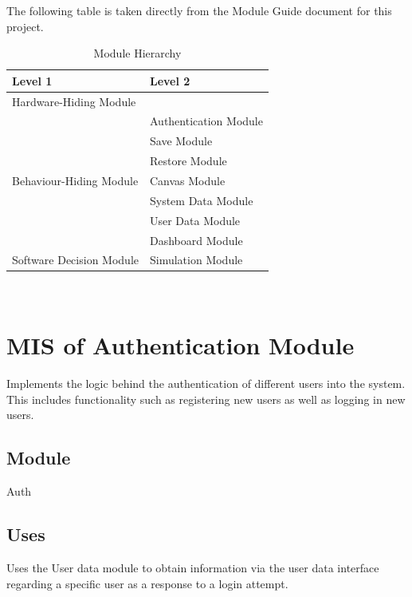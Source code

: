 \documentclass[12pt, titlepage]{article}
\begin{document}
The following table is taken directly from the Module Guide document for this project.

\begin{table}[h!]
  \centering
  \begin{tabular}{p{} p{}}
  \toprule
  \textbf{Level 1} & \textbf{Level 2}\\
  \midrule
  
  {Hardware-Hiding Module} &  \\
  \midrule
  
  \multirow{7}{0.3\textwidth}{Behaviour-Hiding Module} & Authentication Module\\
  & Save Module\\
  & Restore Module\\
  & Canvas Module\\
  & System Data Module\\
  & User Data Module\\
  & Dashboard Module\\
  
  \midrule
  
  \multirow{1}{0.3\textwidth}{Software Decision Module} & Simulation Module\\
  
  \bottomrule
  
  \end{tabular}
  \caption{Module Hierarchy}
  \end{table}

\newpage
~\newpage

\section{MIS of Authentication Module} \label{mAuthMIS} 
Implements the logic behind the authentication of different users into the system. This includes functionality such as registering new users as well as logging in new users. 

\subsection{Module}

Auth

\subsection{Uses}
Uses the User data module to obtain information via the user data interface regarding a specific user as a response to a login attempt. 
\end{document}
